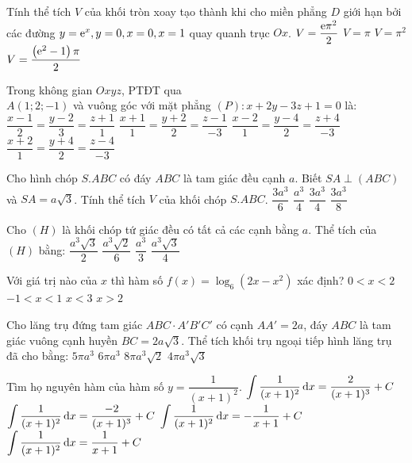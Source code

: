 \begin{ex}%
Tính thể tích $V$ của khối tròn xoay tạo thành khi cho miền phẳng $D$ giới hạn bởi các đường $y={\rm e}^{x}, y=0, x=0, x=1$ quay quanh trục $O x$.
\choice
{$V=\dfrac{{\rm e} \pi^2}{2}$}
{$V=\pi$}
{$V=\pi^2$}
{\True $V=\dfrac{\left({\rm e}^2-1\right) \pi}{2}$}

\end{ex}
\begin{ex}%
Trong không gian $O x y z$, PTĐT qua\\ $A(1; 2;-1)$ và vuông góc với mặt phẳng $(P)\colon x+2 y-3 z+1=0$ là:
\choice
{$\dfrac{x-1}{2}=\dfrac{y-2}{3}=\dfrac{z+1}{1}$}
{$\dfrac{x+1}{1}=\dfrac{y+2}{2}=\dfrac{z-1}{-3}$}
{\True $\dfrac{x-2}{1}=\dfrac{y-4}{2}=\dfrac{z+4}{-3}$}
{$\dfrac{x+2}{1}=\dfrac{y+4}{2}=\dfrac{z-4}{-3}$}

\end{ex}
\begin{ex}%
Cho hình chóp $S.ABC$ có đáy $ABC$ là tam giác đều cạnh $a$. Biết $SA \perp(ABC)$ và $SA=a \sqrt{3}$. Tính thể tích $V$ của khối chóp $S.ABC$.
\choice
{$\dfrac{3 a^3}{6}$}
{\True $\dfrac{a^3}{4}$}
{$\dfrac{3 a^3}{4}$}
{$\dfrac{3 a^3}{8}$}

\end{ex}
\begin{ex}%
Cho $(H)$ là khối chóp tứ giác đều có tất cả các cạnh bằng $a$. Thể tích của $(H)$ bằng:
\choice
{$\dfrac{a^3 \sqrt{3}}{2}$}
{\True $\dfrac{a^3 \sqrt{2}}{6}$}
{$\dfrac{a^3}{3}$}
{$\dfrac{a^3 \sqrt{3}}{4}$}

\end{ex}
\begin{ex}%
Với giá trị nào của $x$ thì hàm số $f(x)=\log_6\left(2 x-x^2\right)$ xác định?
\choice
{\True $0<x<2$}
{$-1<x<1$}
{$x<3$}
{$x>2$}

\end{ex}
\begin{ex}%
Cho lăng trụ đứng tam giác $ABC \cdot A'B'C'$ có cạnh $AA'=2 a$, đáy $ABC$ là tam giác vuông cạnh huyền $BC=2 a \sqrt{3}$. Thể tích khối trụ ngoại tiếp hình lăng trụ đã cho bằng:
\choice
{$5\pi a^3$}
{\True $6\pi a^3$}
{$8\pi a^3 \sqrt{2}$}
{$4\pi a^3 \sqrt{3}$}

\end{ex}
\begin{ex}%
Tìm họ nguyên hàm của hàm số $y=\dfrac{1}{(x+1)^2}$.
\choice
{$\displaystyle\displaystyle\int \dfrac{1}{(x+1)^2} \mathrm{\,d} x=\dfrac{2}{(x+1)^3}+C$}
{$\displaystyle\displaystyle\int \dfrac{1}{(x+1)^2} \mathrm{\,d} x=\dfrac{-2}{(x+1)^3}+C$}
{\True $\displaystyle\displaystyle\int \dfrac{1}{(x+1)^2} \mathrm{\,d} x=-\dfrac{1}{x+1}+C$}
{$\displaystyle\displaystyle\int \dfrac{1}{(x+1)^2} \mathrm{\,d} x=\dfrac{1}{x+1}+C$}

\end{ex}
